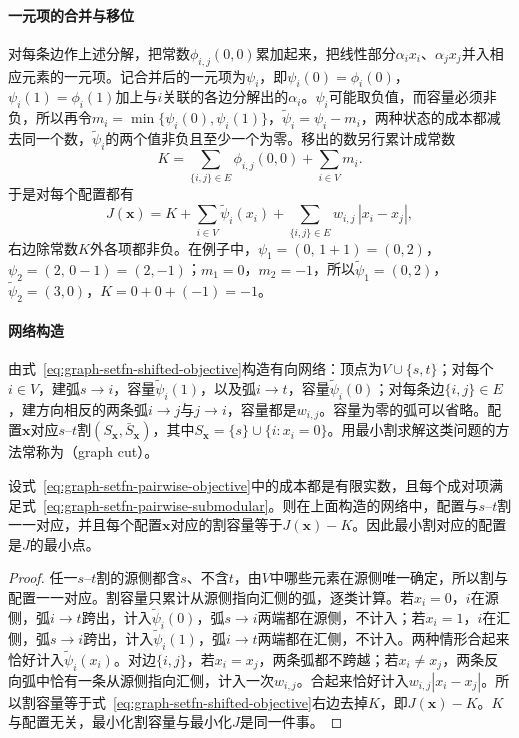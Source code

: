 \paragraph{一元项的合并与移位}
对每条边作上述分解，把常数$\phi_{i,j}(0,0)$累加起来，把线性部分$\alpha_ix_i$、$\alpha_jx_j$并入相应元素的一元项。记合并后的一元项为$\psi_i$，即$\psi_i(0)=\phi_i(0)$，$\psi_i(1)=\phi_i(1)$加上与$i$关联的各边分解出的$\alpha_i$。$\psi_i$可能取负值，而容量必须非负，所以再令$m_i=\min\{\psi_i(0),\psi_i(1)\}$，$\tilde\psi_i=\psi_i-m_i$，两种状态的成本都减去同一个数，$\tilde\psi_i$的两个值非负且至少一个为零。移出的数另行累计成常数
\[
  K=\sum_{\{i,j\}\in E}\phi_{i,j}(0,0)+\sum_{i\in V}m_i .
\]
于是对每个配置都有
\begin{equation}
  J(\bm x)=K+\sum_{i\in V}\tilde\psi_i(x_i)+\sum_{\{i,j\}\in E}w_{i,j}\,|x_i-x_j|,
  \label{eq:graph-setfn-shifted-objective}
\end{equation}
右边除常数$K$外各项都非负。在例子中，$\psi_1=(0,\,1+1)=(0,2)$，$\psi_2=(2,\,0-1)=(2,-1)$；$m_1=0$，$m_2=-1$，所以$\tilde\psi_1=(0,2)$，$\tilde\psi_2=(3,0)$，$K=0+0+(-1)=-1$。

\paragraph{网络构造}
由式~\eqref{eq:graph-setfn-shifted-objective}构造有向网络：顶点为$V\cup\{s,t\}$；对每个$i\in V$，建弧$s\to i$，容量$\tilde\psi_i(1)$，以及弧$i\to t$，容量$\tilde\psi_i(0)$；对每条边$\{i,j\}\in E$，建方向相反的两条弧$i\to j$与$j\to i$，容量都是$w_{i,j}$。容量为零的弧可以省略。配置$\bm x$对应$s$--$t$割$(S_{\bm x},\bar S_{\bm x})$，其中$S_{\bm x}=\{s\}\cup\{i:x_i=0\}$。用最小割求解这类问题的方法常称为（graph cut）。

\begin{theorem}[成对二值函数的割表示]
\label{thm:graph-setfn-cut-representation}
设式~\eqref{eq:graph-setfn-pairwise-objective}中的成本都是有限实数，且每个成对项满足式~\eqref{eq:graph-setfn-pairwise-submodular}。则在上面构造的网络中，配置与$s$--$t$割一一对应，并且每个配置$\bm x$对应的割容量等于$J(\bm x)-K$。因此最小割对应的配置是$J$的最小点。
\end{theorem}

\begin{proof}
任一$s$--$t$割的源侧都含$s$、不含$t$，由$V$中哪些元素在源侧唯一确定，所以割与配置一一对应。割容量只累计从源侧指向汇侧的弧，逐类计算。若$x_i=0$，$i$在源侧，弧$i\to t$跨出，计入$\tilde\psi_i(0)$，弧$s\to i$两端都在源侧，不计入；若$x_i=1$，$i$在汇侧，弧$s\to i$跨出，计入$\tilde\psi_i(1)$，弧$i\to t$两端都在汇侧，不计入。两种情形合起来恰好计入$\tilde\psi_i(x_i)$。对边$\{i,j\}$，若$x_i=x_j$，两条弧都不跨越；若$x_i\neq x_j$，两条反向弧中恰有一条从源侧指向汇侧，计入一次$w_{i,j}$。合起来恰好计入$w_{i,j}|x_i-x_j|$。所以割容量等于式~\eqref{eq:graph-setfn-shifted-objective}右边去掉$K$，即$J(\bm x)-K$。$K$与配置无关，最小化割容量与最小化$J$是同一件事。
\end{proof}

